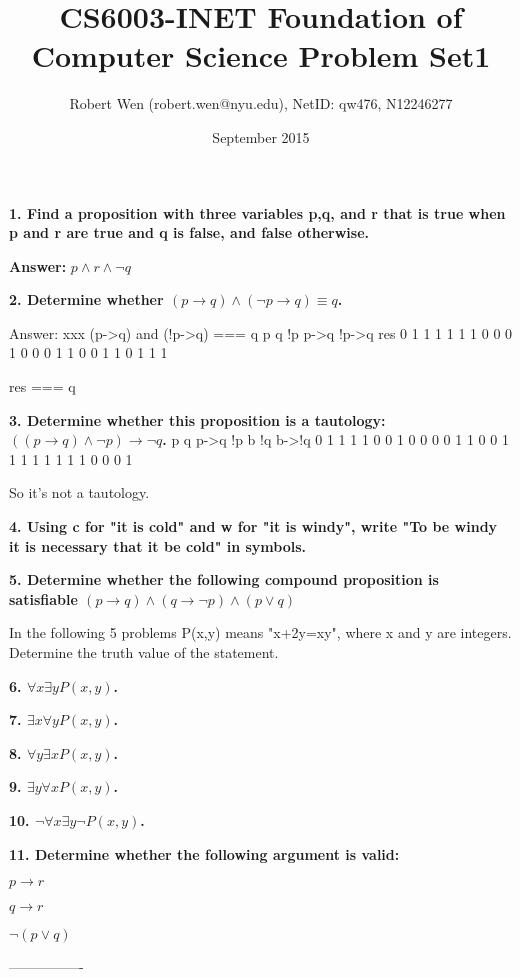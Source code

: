 \documentclass{article}
\title{CS6003-INET Foundation of Computer Science Problem Set1}
\author{Robert Wen (robert.wen@nyu.edu), NetID: qw476, N12246277}
\date{September 2015}
\begin{document}
\maketitle
\setlength{\parindent}{2ex}
\textbf{1. Find a proposition with three variables p,q, and r that is true when p and r are true and q is false, and false otherwise.}

\textbf{Answer:} $p \land r \land \lnot q$
\newline

\textbf{2. Determine whether $(p \to q) \land (\lnot p \to q) \equiv q$.}

Answer: xxx
(p->q) and (!p->q) === q
p  q  !p  p->q  !p->q   res
0  1  1   1     1       1
1  0  0   0     1       0
0  0  1   1     0       0
1  1  0   1     1       1

res === q

\newline

\textbf{3. Determine whether this proposition is a tautology: $((p \to q) \land \lnot p) \to \lnot q$.}
p  q  p->q  !p   b   !q   b->!q
0  1  1     1    1   0    0
1  0  0     0    0   1    1
0  0  1     1    1   1    1
1  1  1     0    0   0    1

So it's not a tautology.

\textbf{4. Using c for "it is cold" and w for "it is windy", write "To be windy it is necessary that it be cold" in symbols.}

\textbf{5. Determine whether the following compound proposition is satisfiable $(p \to q) \land (q \to \lnot p)\land (p \lor q)$}

In the following 5 problems P(x,y) means "x+2y=xy", where x and y are integers. Determine the truth value of the statement.

\textbf{6. $\forall x \exists yP(x,y)$.}

\textbf{7. $\exists x \forall yP(x,y)$.}

\textbf{8. $\forall y \exists xP(x,y)$.}

\textbf{9. $\exists y \forall xP(x,y)$.}

\textbf{10. $\lnot \forall x \exists y \lnot P(x,y)$.}

\textbf{11. Determine whether the following argument is valid:}

\textbf{$p \to r$}

\textbf{$q \to r$}

\textbf{$\lnot (p \lor q)$}

----------------
\end{document}
